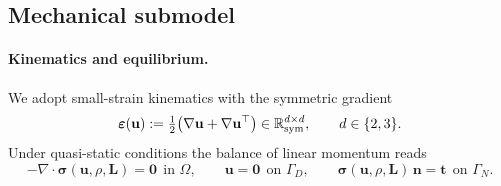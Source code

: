 \subsection*{Mechanical submodel}
\label{subsec:mech-nd}
\paragraph{Kinematics and equilibrium.}
We adopt small-strain kinematics with the symmetric gradient
\begin{equation}\label{eq:mech-eps-nd}
\boldsymbol{\varepsilon}(\mathbf{u}) := \tfrac12\big(\nabla\mathbf{u}+\nabla\mathbf{u}^\top\big)\in\mathbb{R}^{d\times d}_{\rm sym},\qquad d\in\{2,3\}.
\end{equation}
Under quasi-static conditions the balance of linear momentum reads
\begin{equation}\label{eq:mech-strong-nd}
-\nabla\!\cdot\!\boldsymbol{\sigma}(\mathbf{u},\rho,\mathbf{L})=\mathbf{0}\ \ \text{in }\Omega,\qquad
\mathbf{u}=\mathbf{0}\ \ \text{on }\Gamma_D,\qquad
\boldsymbol{\sigma}(\mathbf{u},\rho,\mathbf{L})\,\mathbf{n}=\mathbf{t}\ \ \text{on }\Gamma_N.
\end{equation}

